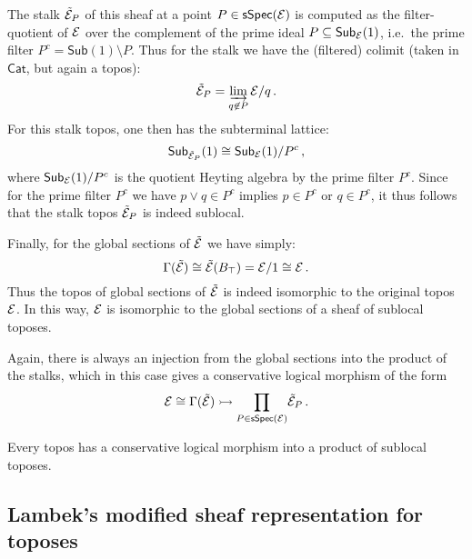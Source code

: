 \documentclass[lambek.tex]{subfiles}
\begin{document}
The stalk $\tilde{\mathcal{E}}_P$ of this sheaf at a point $P\in \mathsf{sSpec}(\mathcal{E})$ is computed as the filter-quotient of $\mathcal{E}$ over the complement of the prime ideal $P\subseteq  \mathsf{Sub}_{\mathcal{E}}(1)$, i.e.\ the prime filter $P^c = \mathsf{Sub}(1)\!\setminus\! P$.  Thus for the stalk we have the (filtered) colimit (taken in $\mathsf{Cat}$, but again a topos):
\[
\tilde{\mathcal{E}}_P = \varinjlim_{q\not\in P} \mathcal{E}/q\,.
\]
For this stalk topos, one then has the subterminal lattice:
\[
\mathsf{Sub}_{\tilde{\mathcal{E}}_P}(1)\cong \mathsf{Sub}_{\mathcal{E}}(1)/P^c\,,
\]
where $\mathsf{Sub}_{\mathcal{E}}(1)/P^c$ is the quotient Heyting algebra by the prime filter $P^c$.  Since for the prime filter $P^c$ we have $p \vee q \in P^c$ implies $p \in P^c$ or $q \in P^c$, it thus follows that the stalk topos $\tilde{\mathcal{E}}_P$ is indeed sublocal.


Finally, for the global sections of $\tilde{\mathcal{E}}$ we  have simply:
$$\Gamma(\tilde{\mathcal{E}}) \cong \tilde{\mathcal{E}}(B_\top) = \mathcal{E}/1 \cong \mathcal{E}\,.$$
Thus the topos of global sections of $\tilde{\mathcal{E}}$ is indeed isomorphic to the original topos $\mathcal{E}$.  In this way, $\mathcal{E}$ is isomorphic to the global sections of a sheaf of sublocal toposes.
\medskip

Again, there is always an injection from the global sections into the product of the stalks, which in this case gives a conservative logical morphism of the form
\[
\mathcal{E} \cong \Gamma(\tilde{\mathcal{E}}) \rightarrowtail \prod_{P\in \mathsf{sSpec}(\mathcal{E})}\!\tilde{\mathcal{E}}_P\,.
\]

\begin{corollary}\label{cor:SDPtopos}
Every topos has a conservative logical morphism into a product of sublocal toposes.
\end{corollary}

\subsection{Lambek's modified sheaf representation for toposes}
\end{document}
